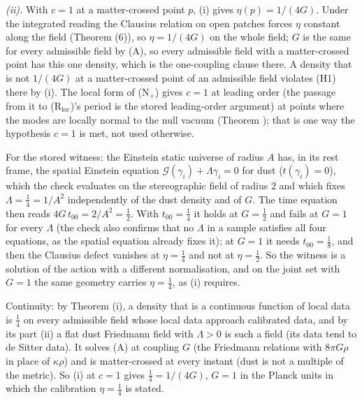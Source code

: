 \emph{(ii).} With $c = 1$ at a matter-crossed point $p$, (i) gives $\eta(p) = 1/(4G)$. Under the integrated reading the Clausius relation on open patches forces $\eta$ constant along the field (Theorem (6)), so $\eta = 1/(4G)$ on the whole field; $G$ is the same for every admissible field by (A), so every admissible field with a matter-crossed point has this one density, which is the one-coupling clause there. A density that is not $1/(4G)$ at a matter-crossed point of an admissible field violates (H1) there by (i). The local form of (N$_{+}$) gives $c = 1$ at leading order (the passage from it to (R$_{\mathrm{loc}}$)'s period is the stored leading-order argument) at points where the modes are locally normal to the null vacuum (Theorem ); that is one way the hypothesis $c = 1$ is met, not used otherwise.

For the stored witness: the Einstein static universe of radius $A$ has, in its rest frame, the spatial Einstein equation $\mathcal{G}(\gamma_{i}) + \Lambda\gamma_{i} = 0$ for dust ($t(\gamma_{i}) = 0$), which the check evaluates on the stereographic field of radius $2$ and which fixes $\Lambda = \tfrac14 = 1/A^{2}$ independently of the dust density and of $G$. The time equation then reads $4G\,t_{00} = 2/A^{2} = \tfrac12$. With $t_{00} = \tfrac14$ it holds at $G = \tfrac12$ and fails at $G = 1$ for every $\Lambda$ (the check also confirms that no $\Lambda$ in a sample satisfies all four equations, as the spatial equation already fixes it); at $G = 1$ it needs $t_{00} = \tfrac18$, and then the Clausius defect vanishes at $\eta = \tfrac14$ and not at $\eta = \tfrac12$. So the witness is a solution of the action with a different normalisation, and on the joint set with $G = 1$ the same geometry carries $\eta = \tfrac14$, as (i) requires.

Continuity: by Theorem (i), a density that is a continuous function of local data is $\tfrac14$ on every admissible field whose local data approach calibrated data, and by its part (ii) a flat dust Friedmann field with $\Lambda > 0$ is such a field (its data tend to de Sitter data). It solves (A) at coupling $G$ (the Friedmann relations with $8\pi G\rho$ in place of $\kappa\rho$) and is matter-crossed at every instant (dust is not a multiple of the metric). So (i) at $c = 1$ gives $\tfrac14 = 1/(4G)$, $G = 1$ in the Planck units in which the calibration $\eta = \tfrac14$ is stated.


